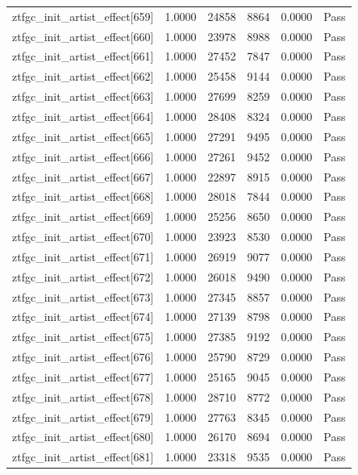 \begin{table}[htbp]
\begin{tabular}{llrrll}
ztfgc\_init\_artist\_effect[659] & 1.0000 & 24858 & 8864 & 0.0000 & Pass \\
ztfgc\_init\_artist\_effect[660] & 1.0000 & 23978 & 8988 & 0.0000 & Pass \\
ztfgc\_init\_artist\_effect[661] & 1.0000 & 27452 & 7847 & 0.0000 & Pass \\
ztfgc\_init\_artist\_effect[662] & 1.0000 & 25458 & 9144 & 0.0000 & Pass \\
ztfgc\_init\_artist\_effect[663] & 1.0000 & 27699 & 8259 & 0.0000 & Pass \\
ztfgc\_init\_artist\_effect[664] & 1.0000 & 28408 & 8324 & 0.0000 & Pass \\
ztfgc\_init\_artist\_effect[665] & 1.0000 & 27291 & 9495 & 0.0000 & Pass \\
ztfgc\_init\_artist\_effect[666] & 1.0000 & 27261 & 9452 & 0.0000 & Pass \\
ztfgc\_init\_artist\_effect[667] & 1.0000 & 22897 & 8915 & 0.0000 & Pass \\
ztfgc\_init\_artist\_effect[668] & 1.0000 & 28018 & 7844 & 0.0000 & Pass \\
ztfgc\_init\_artist\_effect[669] & 1.0000 & 25256 & 8650 & 0.0000 & Pass \\
ztfgc\_init\_artist\_effect[670] & 1.0000 & 23923 & 8530 & 0.0000 & Pass \\
ztfgc\_init\_artist\_effect[671] & 1.0000 & 26919 & 9077 & 0.0000 & Pass \\
ztfgc\_init\_artist\_effect[672] & 1.0000 & 26018 & 9490 & 0.0000 & Pass \\
ztfgc\_init\_artist\_effect[673] & 1.0000 & 27345 & 8857 & 0.0000 & Pass \\
ztfgc\_init\_artist\_effect[674] & 1.0000 & 27139 & 8798 & 0.0000 & Pass \\
ztfgc\_init\_artist\_effect[675] & 1.0000 & 27385 & 9192 & 0.0000 & Pass \\
ztfgc\_init\_artist\_effect[676] & 1.0000 & 25790 & 8729 & 0.0000 & Pass \\
ztfgc\_init\_artist\_effect[677] & 1.0000 & 25165 & 9045 & 0.0000 & Pass \\
ztfgc\_init\_artist\_effect[678] & 1.0000 & 28710 & 8772 & 0.0000 & Pass \\
ztfgc\_init\_artist\_effect[679] & 1.0000 & 27763 & 8345 & 0.0000 & Pass \\
ztfgc\_init\_artist\_effect[680] & 1.0000 & 26170 & 8694 & 0.0000 & Pass \\
ztfgc\_init\_artist\_effect[681] & 1.0000 & 23318 & 9535 & 0.0000 & Pass \\

\end{tabular}
\end{table}
